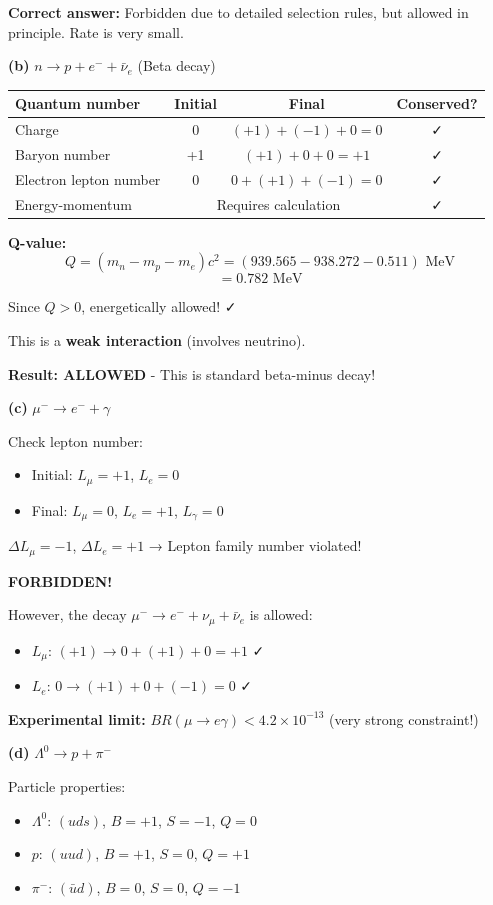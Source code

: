 \documentclass[12pt,a4paper]{article}
\begin{document}
\begin{solution}
\textbf{Correct answer:} Forbidden due to detailed selection rules, but allowed in principle. Rate is very small.

\textbf{(b)} $n \to p + e^- + \bar{\nu}_e$ (Beta decay)

\begin{tabular}{|l|c|c|c|}
\hline
Quantum number & Initial & Final & Conserved? \\
\hline
Charge & 0 & $(+1) + (-1) + 0 = 0$ & ✓ \\
Baryon number & +1 & $(+1) + 0 + 0 = +1$ & ✓ \\
Electron lepton number & 0 & $0 + (+1) + (-1) = 0$ & ✓ \\
Energy-momentum & \multicolumn{2}{c|}{Requires calculation} & ✓ \\
\hline
\end{tabular}

\textbf{Q-value:}
$$Q = (m_n - m_p - m_e)c^2 = (939.565 - 938.272 - 0.511)\text{ MeV}$$
$$= 0.782\text{ MeV}$$

Since $Q > 0$, energetically allowed! ✓

This is a \textbf{weak interaction} (involves neutrino).

\textbf{Result: ALLOWED} - This is standard beta-minus decay!

\textbf{(c)} $\mu^- \to e^- + \gamma$

Check lepton number:
\begin{itemize}
    \item Initial: $L_\mu = +1$, $L_e = 0$
    \item Final: $L_\mu = 0$, $L_e = +1$, $L_\gamma = 0$
\end{itemize}

$\Delta L_\mu = -1$, $\Delta L_e = +1$ → Lepton family number violated!

\textbf{FORBIDDEN!}

However, the decay $\mu^- \to e^- + \nu_\mu + \bar{\nu}_e$ is allowed:
\begin{itemize}
    \item $L_\mu$: $(+1) \to 0 + (+1) + 0 = +1$ ✓
    \item $L_e$: $0 \to (+1) + 0 + (-1) = 0$ ✓
\end{itemize}

\textbf{Experimental limit:} $BR(\mu \to e\gamma) < 4.2 \times 10^{-13}$ (very strong constraint!)

\textbf{(d)} $\Lambda^0 \to p + \pi^-$

Particle properties:
\begin{itemize}
    \item $\Lambda^0$: $(uds)$, $B = +1$, $S = -1$, $Q = 0$
    \item $p$: $(uud)$, $B = +1$, $S = 0$, $Q = +1$
    \item $\pi^-$: $(\bar{u}d)$, $B = 0$, $S = 0$, $Q = -1$
\end{itemize}


\end{solution}
\end{document}
